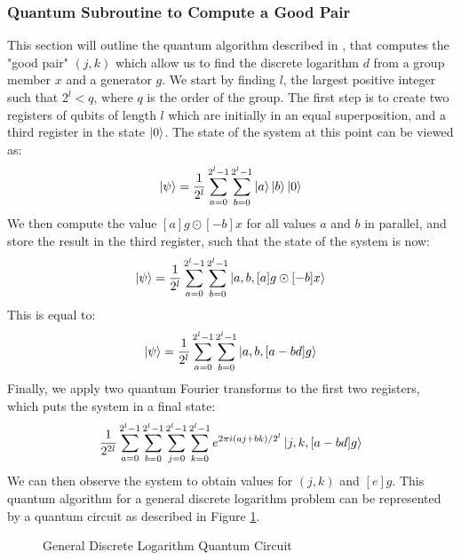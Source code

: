 \subsubsection{Quantum Subroutine to Compute a Good Pair}
This section will outline the quantum algorithm described in \cite{ekeraa2016modifying}, that computes the "good pair" $(j,k)$ which allow us to find the discrete logarithm $d$ from a group member $x$ and a generator $g$. We start by finding $l$, the largest positive integer such that $2^l < q$, where $q$ is the order of the group. The first step is to create two registers of qubits of length $l$ which are initially in an equal superposition, and a third register in the state $\ket{0}$. The state of the system at this point can be viewed as: 
$$\ket{\psi} = \frac{1}{2^l}\sum_{a=0}^{2^l-1}\sum_{b=0}^{2^l-1}\ket{a}\ket{b}\ket{0}$$
We then compute the value $[a]g\odot[-b]x$ for all values $a$ and $b$ in parallel, and store the result in the third register, such that the state of the system is now: 
$$\ket{\psi} = \frac{1}{2^l}\sum_{a=0}^{2^l-1}\sum_{b=0}^{2^l-1}\ket{a,b,[a]g\odot[-b]x}$$ This is equal to:
$$\ket{\psi} = \frac{1}{2^l}\sum_{a=0}^{2^l-1}\sum_{b=0}^{2^l-1}\ket{a,b,[a-bd]g}$$
Finally, we apply two quantum Fourier transforms to the first two registers, which puts the system in a final state:
$$\frac{1}{2^{2l}}\sum_{a=0}^{2^l-1}\sum_{b=0}^{2^l-1}\sum_{j=0}^{2^l-1}\sum_{k=0}^{2^l-1}e^{2\pi i(aj+bk)/2^l}\ket{j,k,[a-bd]g}$$ We can then observe the system to obtain values for $(j,k)$ and $[e]g$. 
This quantum algorithm for a general discrete logarithm problem can be represented by a quantum circuit as described in Figure \ref{fig:generalDLCircuit}.
\begin{figure}[!htb]
\centering
\resizebox{\linewidth}{!}{}
\caption{General Discrete Logarithm Quantum Circuit}
\label{fig:generalDLCircuit}
\end{figure}
